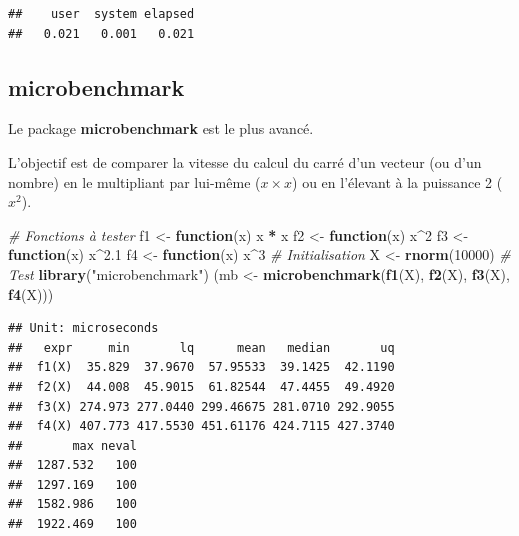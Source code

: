 \documentclass[
  12pt,
  french,
  a4paper,
  extrafontsizes,onecolumn,openright
  ]{memoir}
\newenvironment{Shaded}{\begin{snugshade}}{\end{snugshade}}
\newcommand{\CommentTok}[1]{\textcolor[rgb]{0.56,0.35,0.01}{\textit{#1}}}
\newcommand{\ControlFlowTok}[1]{\textcolor[rgb]{0.13,0.29,0.53}{\textbf{#1}}}
\newcommand{\DecValTok}[1]{\textcolor[rgb]{0.00,0.00,0.81}{#1}}
\newcommand{\FloatTok}[1]{\textcolor[rgb]{0.00,0.00,0.81}{#1}}
\newcommand{\KeywordTok}[1]{\textcolor[rgb]{0.13,0.29,0.53}{\textbf{#1}}}
\newcommand{\NormalTok}[1]{#1}
\newcommand{\OperatorTok}[1]{\textcolor[rgb]{0.81,0.36,0.00}{\textbf{#1}}}
\newcommand{\StringTok}[1]{\textcolor[rgb]{0.31,0.60,0.02}{#1}}
\begin{document}
\begin{verbatim}
##    user  system elapsed 
##   0.021   0.001   0.021
\end{verbatim}

\normalsize

\hypertarget{microbenchmark}{%
\subsection{microbenchmark}\label{microbenchmark}}

Le package \textbf{microbenchmark} est le plus avancé.

L'objectif est de comparer la vitesse du calcul du carré d'un vecteur (ou d'un nombre) en le multipliant par lui-même (\(x \times x\)) ou en l'élevant à la puissance 2 (\(x^2\)).

\scriptsize

\begin{Shaded}
\begin{Highlighting}[]
\CommentTok{# Fonctions à tester}
\NormalTok{f1 <-}\StringTok{ }\ControlFlowTok{function}\NormalTok{(x) x }\OperatorTok{*}\StringTok{ }\NormalTok{x}
\NormalTok{f2 <-}\StringTok{ }\ControlFlowTok{function}\NormalTok{(x) x}\OperatorTok{^}\DecValTok{2}
\NormalTok{f3 <-}\StringTok{ }\ControlFlowTok{function}\NormalTok{(x) x}\OperatorTok{^}\FloatTok{2.1}
\NormalTok{f4 <-}\StringTok{ }\ControlFlowTok{function}\NormalTok{(x) x}\OperatorTok{^}\DecValTok{3}
\CommentTok{# Initialisation}
\NormalTok{X <-}\StringTok{ }\KeywordTok{rnorm}\NormalTok{(}\DecValTok{10000}\NormalTok{)}
\CommentTok{# Test}
\KeywordTok{library}\NormalTok{(}\StringTok{"microbenchmark"}\NormalTok{)}
\NormalTok{(mb <-}\StringTok{ }\KeywordTok{microbenchmark}\NormalTok{(}\KeywordTok{f1}\NormalTok{(X), }\KeywordTok{f2}\NormalTok{(X), }\KeywordTok{f3}\NormalTok{(X), }\KeywordTok{f4}\NormalTok{(X)))}
\end{Highlighting}
\end{Shaded}

\begin{verbatim}
## Unit: microseconds
##   expr     min       lq      mean   median       uq
##  f1(X)  35.829  37.9670  57.95533  39.1425  42.1190
##  f2(X)  44.008  45.9015  61.82544  47.4455  49.4920
##  f3(X) 274.973 277.0440 299.46675 281.0710 292.9055
##  f4(X) 407.773 417.5530 451.61176 424.7115 427.3740
##       max neval
##  1287.532   100
##  1297.169   100
##  1582.986   100
##  1922.469   100
\end{verbatim}

\normalsize
\end{document}
